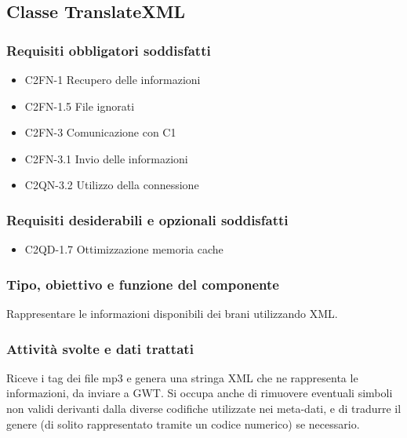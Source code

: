 \subsection{Classe TranslateXML}
\subsubsection*{Requisiti obbligatori soddisfatti}
\begin{itemize}
   \item C2FN-1 Recupero delle informazioni
   \item C2FN-1.5 File ignorati
   \item C2FN-3 Comunicazione con C1
   \item C2FN-3.1 Invio delle informazioni
   \item C2QN-3.2 Utilizzo della connessione
\end{itemize}
\subsubsection*{Requisiti desiderabili e opzionali soddisfatti}
\begin{itemize}
   \item C2QD-1.7 Ottimizzazione memoria cache
\end{itemize}
\subsubsection*{Tipo, obiettivo e funzione del componente}
Rappresentare le informazioni disponibili dei brani utilizzando XML.
\subsubsection*{Attivit\`a svolte e dati trattati}
Riceve i tag dei file mp3 e genera una stringa XML che ne rappresenta le
informazioni, da inviare a GWT.
Si occupa anche di rimuovere eventuali simboli non validi derivanti dalla
diverse codifiche utilizzate nei meta-dati, e di tradurre il genere (di solito
rappresentato tramite un codice numerico) se necessario.
\\
\\

